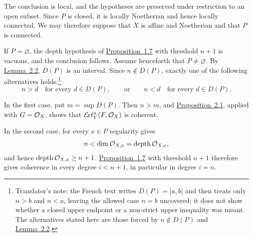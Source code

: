The conclusion is local, and the hypotheses are preserved under restriction
to an open subset. Since $P$ is closed, it is locally Noetherian and hence
locally connected. We may therefore suppose that $X$ is affine and Noetherian
and that $P$ is connected.

If $P=\varnothing$, the depth hypothesis of \hyperref[VII.1.7]{Proposition~1.7} with threshold
$n+1$ is vacuous, and the conclusion follows. Assume henceforth that
$P\neq\varnothing$. By \hyperref[VII.2.2]{Lemma~2.2}, $D(P)$ is an interval. Since
$n\notin D(P)$, exactly one of the following alternatives holds:\footnote{Translator's note: the
French text writes $D(P)=[a,b[$ and then treats only $n>b$ and $n<a$,
leaving the allowed case $n=b$ uncovered; it does not show whether a closed
upper endpoint or a non-strict upper inequality was meant. The alternatives
stated here are those forced by $n\notin D(P)$ and
\hyperref[VII.2.2]{Lemma~2.2}.}
\[
  n>d\quad\text{for every }d\in D(P),
  \qquad\text{or}\qquad
  n<d\quad\text{for every }d\in D(P).
\]

In the first case, put $m=\sup D(P)$. Then $n>m$, and \hyperref[VII.2.1]{Proposition~2.1},
applied with $G=\mathcal O_X$, shows that $\mathcal E\!xt_Y^n(F,\mathcal O_X)$ is coherent.

In the second case, for every $x\in P$ regularity gives
\[
  n<\dim\mathcal O_{X,x}=\operatorname{depth}\mathcal O_{X,x},
\]
and hence $\operatorname{depth}\mathcal O_{X,x}\geq n+1$. \hyperref[VII.1.7]{Proposition~1.7} with threshold
$n+1$ therefore gives coherence in every degree $i<n+1$, in particular in
degree $i=n$.
